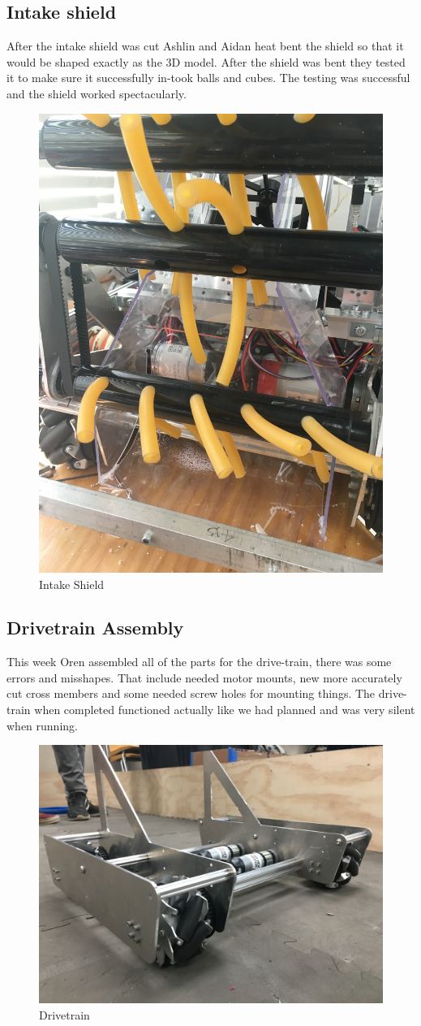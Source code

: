 \documentclass{article}
\begin{document}
\subsection{Intake shield}
After the intake shield was cut Ashlin and Aidan heat bent the shield so that it would be shaped exactly as the 3D model. After the shield was bent they tested it to make sure it successfully in-took balls and cubes. The testing was successful and the shield worked  spectacularly.

\begin{figure}
    \centering
    \includegraphics[width=.6\textwidth, angle=270]{10_11-05/images/intake_shield.JPG}
    \caption{Intake Shield}
    \label{fig:Intake Shield}
\end{figure}

\subsection{Drivetrain Assembly}
This week Oren assembled all of the parts for the drive-train, there was some errors and misshapes. That include needed motor mounts, new more accurately cut cross members and some needed   screw holes for mounting things. The drive-train when completed functioned actually like we had planned and was very silent when running.    

\begin{figure}
    \centering
    \includegraphics[width=.6 \textwidth]{10_11-05/images/drivetrain.JPG}
    \caption{Drivetrain}
    \label{fig:drivetrain}
\end{figure}
\end{document}
